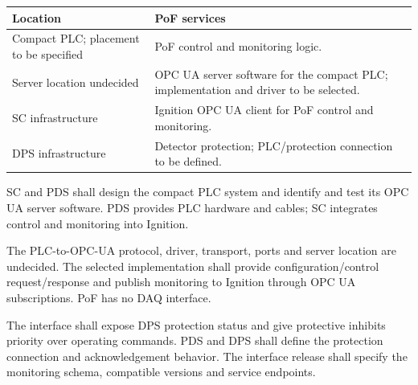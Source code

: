 \begin{center}\small
\begin{tabular}{L{0.25\textwidth}L{0.68\textwidth}}
\toprule
\textbf{Location} & \textbf{PoF services} \\
\midrule
Compact PLC; placement to be specified & PoF control and monitoring logic. \\
Server location undecided & OPC UA server software for the compact PLC; implementation and driver to be selected. \\
SC infrastructure & Ignition OPC UA client for PoF control and monitoring. \\
DPS infrastructure & Detector protection; PLC/protection connection to be defined. \\
\bottomrule
\end{tabular}
\end{center}
SC and PDS shall design the compact PLC system and identify and test its
OPC UA server software. PDS provides PLC hardware and cables; SC integrates
control and monitoring into Ignition.

The PLC-to-OPC-UA protocol, driver, transport, ports and server location are
undecided. The selected implementation shall provide configuration/control
request/response and publish monitoring to Ignition through OPC UA
subscriptions. PoF has no DAQ interface.

The interface shall expose DPS protection status and give protective inhibits
priority over operating commands. PDS and DPS shall define the protection
connection and acknowledgement behavior. The interface release shall specify
the monitoring schema, compatible versions and service endpoints.
